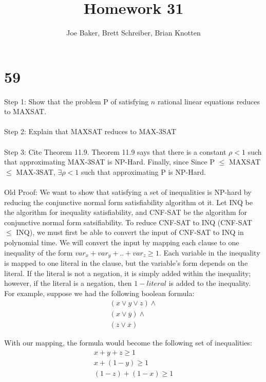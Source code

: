 \documentclass[letterpaper,notitlepage,twoside]{article}
\begin{document}
\title{Homework 31}
\author{Joe Baker, Brett Schreiber, Brian Knotten}
\maketitle

\section*{59}
Step 1: Show that the problem P of satisfying $n$ rational linear equations reduces to MAXSAT.
\\\\
Step 2: Explain that MAXSAT reduces to MAX-3SAT
\\\\
Step 3: Cite Theorem 11.9. Theorem 11.9 says that there is a constant $\rho < 1$ such that approximating MAX-3SAT is NP-Hard. Finally, since Since P $\leq$ MAXSAT $\leq$ MAX-3SAT, $\exists \rho < 1$ such that approximating P is NP-Hard.
\\\\
Old Proof:
We want to show that satisfying a set of inequalities is NP-hard by reducing the conjunctive normal form satisfiability algorithm ot it. Let INQ be the algorithm for inequality satisfiability, and CNF-SAT be the algorithm for conjunctive normal form satsifiability. To reduce CNF-SAT to INQ (CNF-SAT $\leq$ INQ), we must first be able to convert the input of CNF-SAT to INQ in polynomial time. We will convert the input by mapping each clause to one inequality of the form $var_x + var_y + .. + var_z \geq 1$. Each variable in the inequality is mapped to one literal in the clause, but the variable's form depends on the literal. If the literal is not a negation, it is simply added within the inequality; however, if the literal is a negation, then $1 - literal$ is added to the inequality. For example, suppose we had the following boolean formula:
\begin{gather*}
(x \vee y \vee z) \wedge \\
(x \vee \overline{y}) \wedge \\
(\overline{z} \vee \overline{x})
\end{gather*}

\noindent With our mapping, the formula would become the following set of inequalities:
\begin{gather*}
x + y + z \geq 1 \\
x + (1-y) \geq 1 \\
(1-z) + (1-x) \geq 1
\end{gather*}
\end{document}

